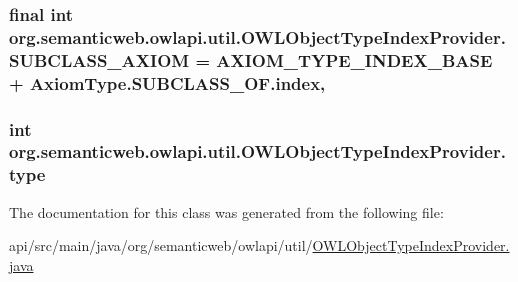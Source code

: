 \hypertarget{classorg_1_1semanticweb_1_1owlapi_1_1util_1_1_o_w_l_object_type_index_provider_a0edbf779b39f933b1ad25bb1ee16267d}{
\subsubsection[{S\-U\-B\-C\-L\-A\-S\-S\-\_\-\-A\-X\-I\-O\-M}]{\setlength{\rightskip}{0pt plus 5cm}final int org.\-semanticweb.\-owlapi.\-util.\-O\-W\-L\-Object\-Type\-Index\-Provider.\-S\-U\-B\-C\-L\-A\-S\-S\-\_\-\-A\-X\-I\-O\-M = {\bf A\-X\-I\-O\-M\-\_\-\-T\-Y\-P\-E\-\_\-\-I\-N\-D\-E\-X\-\_\-\-B\-A\-S\-E} + Axiom\-Type.\-S\-U\-B\-C\-L\-A\-S\-S\-\_\-\-O\-F.\-index\hspace{0.3cm}{\ttfamily [static]}, {\ttfamily [private]}}}\label{classorg_1_1semanticweb_1_1owlapi_1_1util_1_1_o_w_l_object_type_index_provider_a0edbf779b39f933b1ad25bb1ee16267d}
\hypertarget{classorg_1_1semanticweb_1_1owlapi_1_1util_1_1_o_w_l_object_type_index_provider_add577f4c9b20fccc32e6f69229ba7f9b}{
\subsubsection[{type}]{\setlength{\rightskip}{0pt plus 5cm}int org.\-semanticweb.\-owlapi.\-util.\-O\-W\-L\-Object\-Type\-Index\-Provider.\-type\hspace{0.3cm}{\ttfamily [private]}}}\label{classorg_1_1semanticweb_1_1owlapi_1_1util_1_1_o_w_l_object_type_index_provider_add577f4c9b20fccc32e6f69229ba7f9b}


The documentation for this class was generated from the following file\-:\begin{DoxyCompactItemize}
\item 
api/src/main/java/org/semanticweb/owlapi/util/\hyperlink{_o_w_l_object_type_index_provider_8java}{O\-W\-L\-Object\-Type\-Index\-Provider.\-java}\end{DoxyCompactItemize}
